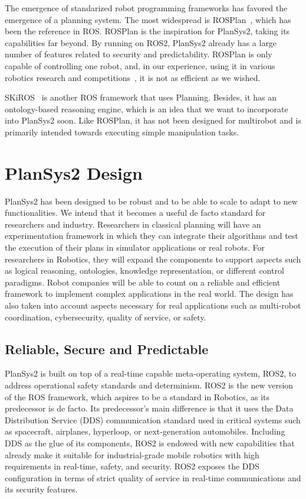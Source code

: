 \documentclass[letterpaper, 10 pt, conference]{IEEEtran}
\begin{document}
The emergence of standarized robot programming frameworks has favored the emergence of a planning system. The most widespread is ROSPlan~\cite{ICAPS1510619}, which has been the reference in ROS. ROSPlan is the inspiration for PlanSys2, taking its capabilities far beyond. By running on ROS2, PlanSys2 already has a large number of features related to security and predictability. ROSPlan is only capable of controlling one robot, and, in our experience, using it in various robotics research and competitions~\cite{app10176067}, it is not as efficient as we wished.

SKiROS~\cite{skiros} is another ROS framework that uses Planning. Besides, it has an ontology-based reasoning engine, which is an idea that we want to incorporate into PlanSys2 soon. Like ROSPlan, it has not been designed for multirobot and is primarily intended towards executing simple manipulation tasks.

\section{PlanSys2 Design}
\label{sec:design}

PlanSys2 has been designed to be robust and to be able to scale to adapt to new functionalities. We intend that it becomes a useful de facto standard for researchers and industry. Researchers in classical planning will have an experimentation framework in which they can integrate their algorithms and test the execution of their plans in simulator applications or real robots. For researchers in Robotics, they will expand the components to support aspects such as logical reasoning, ontologies, knowledge representation, or different control paradigms. Robot companies will be able to count on a reliable and efficient framework to implement complex applications in the real world. The design has also taken into account aspects necessary for real applications such as multi-robot coordination, cybersecurity, quality of service, or safety.

\subsection{Reliable, Secure and Predictable}

PlanSys2 is built on top of a real-time capable meta-operating system, ROS2, to address operational safety standards and determinism. ROS2 is the new version of the ROS framework, which aspires to be a standard in Robotics, as its predecessor is de facto. Its predecessor's main difference is that it uses the Data Distribution Service (DDS) communication standard used in critical systems such as spacecraft, airplanes, hyperloop, or next-generation automobiles. Including DDS as the glue of its components, ROS2 is endowed with new capabilities that already make it suitable for industrial-grade mobile robotics with high requirements in real-time, safety, and security. ROS2 exposes the DDS configuration in terms of strict quality of service in real-time communications and its security features.
\end{document}
